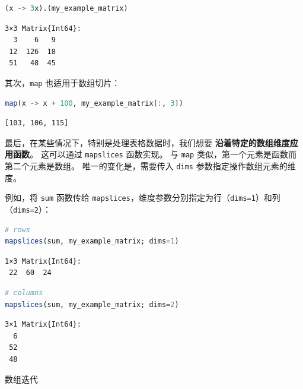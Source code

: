 \documentclass[
  notoc %
]{tufte-book}
\makeatletter
\newcommand{\passthrough}[1]{#1}
\renewcommand\subsubsection{%
\@startsection{subsubsection}{3}{\z@ }{-3.25ex\@plus -1ex \@minus -.2ex}{1.5ex \@plus .2ex}{\normalfont \normalsize \bfseries }
}
\makeatother
\begin{document}
\begin{lstlisting}[language=Julia]
(x -> 3x).(my_example_matrix)
\end{lstlisting}

\begin{lstlisting}[language=Output]
3×3 Matrix{Int64}:
  3    6   9
 12  126  18
 51   48  45
\end{lstlisting}

其次，\passthrough{\lstinline!map!} 也适用于数组切片：

\begin{lstlisting}[language=Julia]
map(x -> x + 100, my_example_matrix[:, 3])
\end{lstlisting}

\begin{lstlisting}[language=Output]
[103, 106, 115]
\end{lstlisting}

最后，在某些情况下，特别是处理表格数据时，我们想要
\textbf{沿着特定的数组维度应用函数}。 这可以通过
\passthrough{\lstinline!mapslices!} 函数实现。 与
\passthrough{\lstinline!map!} 类似，第一个元素是函数而第二个元素是数组。
唯一的变化是，需要传入 \passthrough{\lstinline!dims!}
参数指定操作数组元素的维度。

例如，将 \passthrough{\lstinline!sum!} 函数传给
\passthrough{\lstinline!mapslices!}，维度参数分别指定为行（\passthrough{\lstinline!dims=1!}）和列（\passthrough{\lstinline!dims=2!}）：

\begin{lstlisting}[language=Julia]
# rows
mapslices(sum, my_example_matrix; dims=1)
\end{lstlisting}

\begin{lstlisting}[language=Output]
1×3 Matrix{Int64}:
 22  60  24
\end{lstlisting}

\begin{lstlisting}[language=Julia]
# columns
mapslices(sum, my_example_matrix; dims=2)
\end{lstlisting}

\begin{lstlisting}[language=Output]
3×1 Matrix{Int64}:
  6
 52
 48
\end{lstlisting}

\hypertarget{sec:array_iteration}{%
\subsubsection{数组迭代}\label{sec:array_iteration}}
\end{document}
